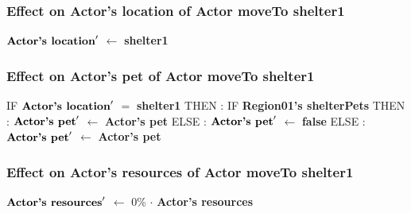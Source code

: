 \documentclass{article}%
\begin{document}
%
\subsubsection{Effect on Actor's location of Actor moveTo shelter1}%
\label{ssubsec:Effect on Actor's location of Actor moveTo shelter1}%
\begin{flushleft}%
$\mbox{\textbf{Actor's location}} '$%
$\leftarrow$%
\textbf{shelter1}%
\end{flushleft}

%
\subsubsection{Effect on Actor's pet of Actor moveTo shelter1}%
\label{ssubsec:Effect on Actor's pet of Actor moveTo shelter1}%
\begin{flushleft}%
IF %
$\mbox{\textbf{Actor's location}} '$%
$=$%
\textbf{shelter1}%
\linebreak%
\hspace*{2em}%
THEN %
: %
IF %
\textbf{Region01's shelterPets}%
\linebreak%
\hspace*{4em}%
THEN %
: %
$\mbox{\textbf{Actor's pet}} '$%
$\leftarrow$%
\textbf{Actor's pet}%
\linebreak%
\hspace*{4em}%
ELSE %
: %
$\mbox{\textbf{Actor's pet}} '$%
$\leftarrow$%
\textbf{false}%
\linebreak%
\hspace*{2em}%
ELSE %
: %
$\mbox{\textbf{Actor's pet}} '$%
$\leftarrow$%
\textbf{Actor's pet}%
\end{flushleft}

%
\subsubsection{Effect on Actor's resources of Actor moveTo shelter1}%
\label{ssubsec:Effect on Actor's resources of Actor moveTo shelter1}%
\begin{flushleft}%
$\mbox{\textbf{Actor's resources}} '$%
$\leftarrow$%
0\%%
$\cdot$%
\textbf{Actor's resources}%
\end{flushleft}

%
\end{document}
